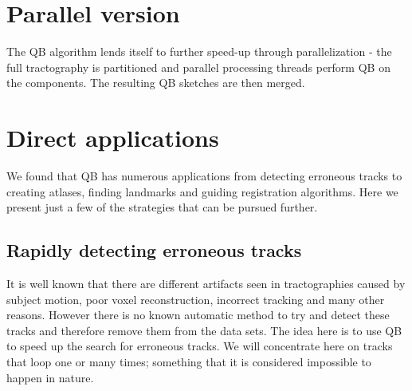 \documentclass[preprint,authoryear,a4paper,10pt,onecolumn]{elsarticle}
\begin{document}
\section{Parallel version\label{sub:Parallel-version}}

The QB algorithm lends itself to further speed-up through
parallelization - the full tractography is partitioned and parallel
processing threads perform QB on the components. The resulting QB
sketches are then merged.



\section{Direct applications}

We found that QB has numerous applications from detecting erroneous
tracks to creating atlases, finding landmarks and guiding registration
algorithms. Here we present just a few of the strategies that can be
pursued further.


\subsection{Rapidly detecting erroneous tracks}

It is well known that there are different artifacts seen in
tractographies caused by subject motion, poor voxel reconstruction,
incorrect tracking and many other reasons. However there is no known
automatic method to try and detect these tracks and therefore remove
them from the data sets. The idea here is to use QB to speed up the
search for erroneous tracks. We will concentrate here on tracks that
loop one or many times; something that it is considered impossible to
happen in nature.
\end{document}
